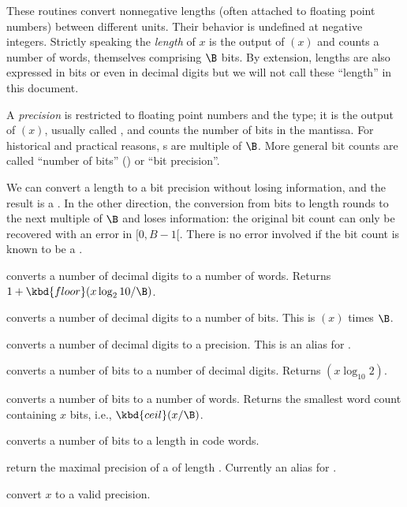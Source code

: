 
These routines convert nonnegative lengths (often attached to floating point
numbers) between different units. Their behavior is undefined at negative
integers. Strictly speaking the \emph{length} of $x$ is the output of
$(x)$ and counts a number of words, themselves comprising $\B$ bits.
By extension, lengths are also expressed in bits or even in decimal digits
but we will not call these ``length'' in this document.

A \emph{precision} is restricted to floating point numbers and the 
type; it is the output of $(x)$, usually called , and
counts the number of bits in the mantissa. For historical and practical
reasons, s are multiple of $\B$. More general bit counts are called
``number of bits'' () or ``bit precision''.

We can convert a length to a bit precision without losing information, and
the result is a . In the other direction, the conversion from bits
to length rounds to the next multiple of $\B$ and loses information: the
original bit count can only be recovered with an error in $[0,B-1[$. There is
no error involved if the bit count is known to be a .

 converts a number of decimal digits to a number
of words. Returns $ 1 + \kbd{floor}(x \log_2 10 / \B)$.

 converts a number of decimal digits to a
number of bits. This is $(x)$ times $\B$.

 converts a number of decimal digits to a
precision. This is an alias for .

 converts a number of bits to a number of
decimal digits. Returns $(x \log_{10} 2)$.

 converts a number of bits to a number of
words. Returns the smallest word count containing $x$ bits, i.e.,
$\kbd{ceil}(x / \B)$.

 converts a number of bits to a length
in code words.

 return the maximal precision of a 
of length . Currently an alias for .

 convert $x$ to a valid precision.

